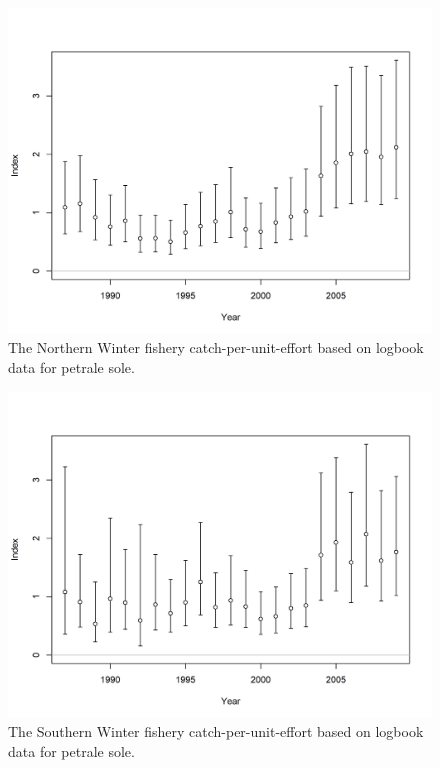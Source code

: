\documentclass[12pt,]{article}
\begin{document}
\FloatBarrier

\begin{figure}
\centering
\includegraphics{r4ss/plots_mod1/index1_cpuedata_Winter (N).png}
\caption{The Northern Winter fishery catch-per-unit-effort based on
logbook data for petrale sole. \label{fig:north_cpue}}
\end{figure}

\FloatBarrier

\begin{figure}
\centering
\includegraphics{r4ss/plots_mod1/index1_cpuedata_Winter (S).png}
\caption{The Southern Winter fishery catch-per-unit-effort based on
logbook data for petrale sole. \label{fig:south_cpue}}
\end{figure}
\end{document}

